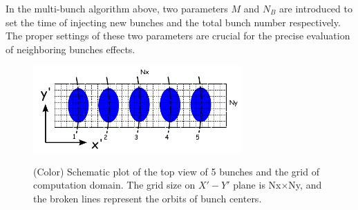 \documentclass[aps,prstab,onecolumn,superscriptaddress,showpacs]{revtex4}
\begin{document}
In the multi-bunch algorithm above, two parameters $M$ and $N_B$ are introduced to set the time of injecting new bunches and the total bunch number respectively. 
The proper settings of these two parameters are crucial for the precise  evaluation of neighboring bunches effects. 
\begin{figure}
    {\includegraphics[width=8cm]{figures/SM-MultiBunch.pdf}}
    \caption{(Color) Schematic plot of the top view of 5 bunches and the grid of computation domain. The grid size on $X'-Y'$ plane is Nx$\times$Ny, and the broken lines represent the orbits of bunch centers. }
    \label{fig:MultiBunch}
\end{figure}
\end{document}
